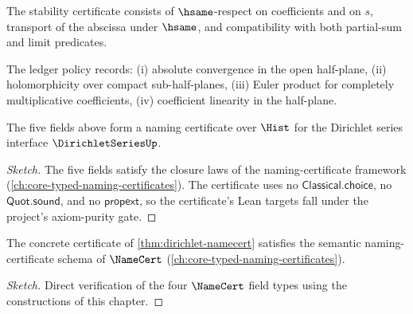 \begin{definition}
\label{def:dir-stability-cert}
The stability certificate consists of \(\hsame\)-respect on coefficients and on \(s\), transport of the abscissa under \(\hsame\), and compatibility with both partial-sum and limit predicates.
\end{definition}

\begin{definition}
\label{def:dir-ledger-policy}
The ledger policy records: (i) absolute convergence in the open half-plane, (ii) holomorphicity over compact sub-half-planes, (iii) Euler product for completely multiplicative coefficients, (iv) coefficient linearity in the half-plane.
\end{definition}

\begin{theorem}
\label{thm:dirichlet-namecert}
The five fields above form a naming certificate over \(\Hist\) for the Dirichlet series interface \(\DirichletSeriesUp\).
\end{theorem}
\begin{proof}[Sketch]
The five fields satisfy the closure laws of the naming-certificate framework (\autoref{ch:core-typed-naming-certificates}). The certificate uses no \(\mathsf{Classical.choice}\), no \(\mathsf{Quot.sound}\), and no \(\mathsf{propext}\), so the certificate's Lean targets fall under the project's axiom-purity gate.
\end{proof}

\begin{theorem}
\label{thm:dirichlet-semantic-namecert}
The concrete certificate of \autoref{thm:dirichlet-namecert} satisfies the semantic naming-certificate schema of \(\NameCert\) (\autoref{ch:core-typed-naming-certificates}).
\end{theorem}
\begin{proof}[Sketch]
Direct verification of the four \(\NameCert\) field types using the constructions of this chapter.
\end{proof}

